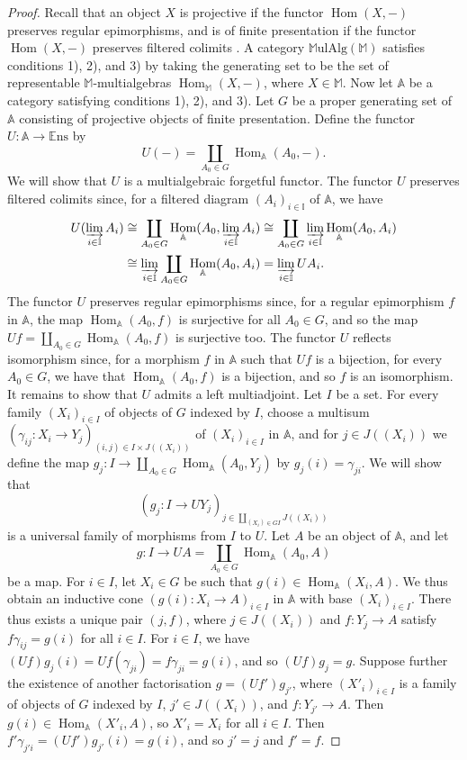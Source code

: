 \documentclass{article}
\newcommand{\bb}[1]{{\mathbb{#1}}}
\newcommand{\Set}{\mathbb{E}\mathrm{ns}}
\newcommand{\MulAlg}{\mathbb{M}\mathrm{ulAlg}}
\DeclareMathOperator{\Hom}{Hom}
\newcommand{\oldpage}[1]{\marginpar{\footnotesize$\Big\vert$ \textit{p.~#1}}}
\begin{document}
\begin{proof}
  Recall that an object $X$ is projective if the functor $\Hom(X,-)$ preserves regular epimorphisms, and is of finite presentation if the functor $\Hom(X,-)$ preserves filtered colimits \cite{5}.
  A category $\MulAlg(\bb{M})$ satisfies conditions 1), 2), and 3) by taking the generating set to be the set of representable $\bb{M}$-multialgebras $\Hom_\bb{M}(X,-)$, where $X\in\bb{M}$.
  Now let $\bb{A}$ be a category satisfying conditions 1), 2), and 3).
  Let $G$ be a proper generating set of $\bb{A}$ consisting of projective objects of finite presentation.
  Define the functor $U\colon\bb{A}\to\Set$ by
  \[
    U(-) = \coprod_{A_0\in G} \Hom_\bb{A}(A_0,-).
  \]
\oldpage{204}
  We will show that $U$ is a multialgebraic forgetful functor.
  The functor $U$ preserves filtered colimits since, for a filtered diagram $(A_i)_{i\in\bb{I}}$ of $\bb{A}$, we have
  \[
    \begin{aligned}
      U(\varinjlim_{i\in\bb{I}} A_i)
      &\cong \coprod_{A_0\in G} \Hom_\bb{A}(A_0,\varinjlim_{i\in\bb{I}} A_i)
      \cong \coprod_{A_0\in G} \varinjlim_{i\in\bb{I}} \Hom_\bb{A}(A_0,A_i)
    \\&\cong \varinjlim_{i\in\bb{I}} \coprod_{A_0\in G} \Hom_\bb{A}(A_0,A_i)
      = \varinjlim_{i\in\bb{I}} UA_i.
    \end{aligned}
  \]
  The functor $U$ preserves regular epimorphisms since, for a regular epimorphism $f$ in $\bb{A}$, the map $\Hom_\bb{A}(A_0,f)$ is surjective for all $A_0\in G$, and so the map $Uf=\coprod_{A_0\in G}\Hom_\bb{A}(A_0,f)$ is surjective too.
  The functor $U$ reflects isomorphism since, for a morphism $f$ in $\bb{A}$ such that $Uf$ is a bijection, for every $A_0\in G$, we have that $\Hom_\bb{A}(A_0,f)$ is a bijection, and so $f$ is an isomorphism.
  It remains to show that $U$ admits a left multiadjoint.
  Let $I$ be a set.
  For every family $(X_i)_{i\in I}$ of objects of $G$ indexed by $I$, choose a multisum $(\gamma_{ij}\colon X_i\to Y_j)_{(i,j)\in I\times J((X_i))}$ of $(X_i)_{i\in I}$ in $\bb{A}$, and for $j\in J((X_i))$ we define the map $g_j\colon I\to\coprod_{A_0\in G}\Hom_\bb{A}(A_0,Y_j)$ by $g_j(i)=\gamma_{ji}$.
  We will show that
  \[
    (g_j\colon I\to UY_j)_{j\in\coprod_{(X_i)\in GI}J((X_i))}
  \]
  is a universal family of morphisms from $I$ to $U$.
  Let $A$ be an object of $\bb{A}$, and let
  \[
    g\colon I\to UA = \coprod_{A_0\in G} \Hom_\bb{A}(A_0,A)
  \]
  be a map.
  For $i\in I$, let $X_i\in G$ be such that $g(i)\in\Hom_\bb{A}(X_i,A)$.
  We thus obtain an inductive cone $(g(i)\colon X_i\to A)_{i\in I}$ in $\bb{A}$ with base $(X_i)_{i\in I}$.
  There thus exists a unique pair $(j,f)$, where $j\in J((X_i))$ and $f\colon Y_j\to A$ satisfy $f\gamma_{ij}=g(i)$ for all $i\in I$.
  For $i\in I$, we have $(Uf)g_j(i)=Uf(\gamma_{ji})=f\gamma_{ji}=g(i)$, and so $(Uf)g_j=g$.
  Suppose further the existence of another factorisation $g=(Uf')g_{j'}$, where $(X'_i)_{i\in I}$ is a family of objects of $G$ indexed by $I$, $j'\in J((X_i))$, and $f\colon Y_{j'}\to A$.
  Then $g(i)\in\Hom_\bb{A}(X'_i,A)$, so $X'_i=X_i$ for all $i\in I$.
  Then $f'\gamma_{j'i}=(Uf')g_{j'}(i)=g(i)$, and so $j'=j$ and $f'=f$.
\end{proof}
\end{document}
